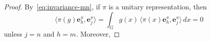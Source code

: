 \documentclass[10pt,a4paper]{amsart}
\newcommand{\Discr}{\mathbb{D}_m}
\newcommand{\R}{\mathbb{R}}
\newcommand{\eb}{\mathbf{e}}
\newcommand{\var}{s}
\begin{document}
\begin{proof}
%
%
By~\eqref{eq:invariance-mn}, if $\pi$ is a unitary representation, then
\[
\langle \pi(g)\eb^\pi_h,\eb^\pi_j\rangle=\int_G g(x)\, \langle \pi(x)\eb^\pi_h,\eb^\pi_j\rangle\, dx=0
\]
unless  $j=n$ and $h=m$. Moreover, 

\end{proof}
\end{document}
